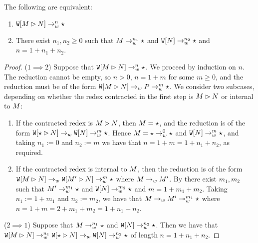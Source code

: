 \begin{lemma}[Splitting]
\label{lem:splitting}
The following are equivalent:
\begin{enumerate}
\item
  $\mathtt{W}[M\rhd N] \to_{w}^n \star$
\item
  There exist $n_1,n_2 \geq 0$ such that
  $M \to_{w}^{n_1} \star$
  and $\mathtt{W}[N] \to_{w}^{n_2} \star$
  and $n = 1 + n_1 + n_2$.
\end{enumerate}
\end{lemma}
\begin{proof}
($1 \implies 2$)
  Suppose that $\mathtt{W}[M\rhd N] \to_{w}^n \star$.
  We proceed by induction on $n$.
  The reduction cannot be empty, so $n > 0$, \ie $n = 1 + m$ for some $m \geq 0$,
  and the reduction must be of the form
  $\mathtt{W}[M\rhd N] \to_{w} P \to_{w}^m \star$.
  We consider two subcases, depending on whether
  the redex contracted in the first step is $M\rhd N$
  or internal to $M$:
  \begin{enumerate}
  \item
    If the contracted redex is $M\rhd N$,
    then $M = \star$,
    and the reduction is of the form
    $\mathtt{W}[\star\rhd N]
     \to_{w} \mathtt{W}[N]
     \to_{w}^m \star$.
    Hence $M = \star \to_{w}^0 \star$
    and $\mathtt{W}[N] \to_{w}^m \star$,
    and taking $n_1 := 0$ and $n_2 := m$ we have that
    $n = 1 + m = 1 + n_1 + n_2$, as required.
  \item
    If the contracted redex is internal to $M$,
    then the reduction is of the form
    $\mathtt{W}[M\rhd N]
     \to_{w} \mathtt{W}[M'\rhd N]
     \to_{w}^m \star$
    where $M \to_{w} M'$.
    By \ih there exist $m_1,m_2$
    such that $M' \to_{w}^{m_1} \star$
    and $\mathtt{W}[N] \to_{w}^{m_2} \star$
    and $m = 1 + m_1 + m_2$.
    Taking $n_1 := 1 + m_1$ and $n_2 := m_2$,
    we have that
    $M \to_{w} M' \twoheadrightarrow_{w}^{m_1} \star$
    where $n = 1 + m = 2 + m_1 + m_2 = 1 + n_1 + n_2$.
  \end{enumerate}
($2 \implies 1$)
  Suppose that $M \to_{w}^{n_1} \star$ and $\mathtt{W}[N] \to_{w}^{n_2} \star$.
  Then we have that
  $\mathtt{W}[M\rhd N]
  \to_{w}^{n_1} \mathtt{W}[\star\rhd N]
  \to_{w} \mathtt{W}[N]
  \to_{w}^{n_2} \star$
  of length $n = 1 + n_1 + n_2$.
\end{proof}


